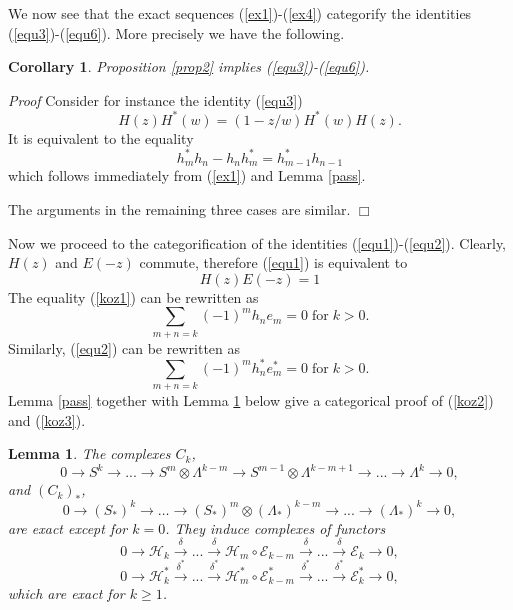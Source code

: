 \documentclass[11pt]{amsart}
\newcounter{theorem}
\newtheorem{lemma}[theo]{Lemma}
\newtheorem{corollary}[theo]{Corollary}
\renewenvironment{proof}{ \emph{Proof}}{$\Box$}
\newcommand{\refle}[1]{Lemma \ref{#1}}
\newcommand{\refprop}[1]{Proposition \ref{#1}}
\newcommand{\refeq}[1]{(\ref{#1})}
\begin{document}
We now see that the exact sequences (\ref{ex1})-(\ref{ex4}) categorify the identities (\ref{equ3})-(\ref{equ6}).
More precisely we have the following.
\begin{corollary}\label{cat1} \refprop{prop2} implies (\ref{equ3})-(\ref{equ6}).
\end{corollary}
\begin{proof} Consider for instance the identity (\ref{equ3})
$$H(z)H^*(w)=(1-z/w)H^*(w)H(z).$$
It is equivalent to the equality
$$h^*_m h_n-h_n h^*_m=h^*_{m-1}h_{n-1}$$
which follows immediately from (\ref{ex1}) and Lemma
\ref{pass}.

The arguments in the remaining three cases are similar. 
\end{proof}

Now we proceed to the categorification of the identities (\ref{equ1})-(\ref{equ2}).
Clearly, $H(z)$ and $E(-z)$ commute, therefore  (\ref{equ1}) is
equivalent to 
\begin{equation}\label{koz1}
H(z)E(-z)=1
\end{equation}
The equality \refeq{koz1} can be rewritten as
\begin{equation}\label{koz2}
\sum_{m+n=k}(-1)^m{h}_n{e}_m=0\;\mathrm{for\;} k>0.
\end{equation}
Similarly, (\ref{equ2}) can be rewritten as 
\begin{equation}\label{koz3}
\sum_{m+n=k}(-1)^m{h}^*_n{e}^*_m=0\;\mathrm{for\;} k>0.
\end{equation}
Lemma \ref{pass} together with \refle{lemma5} below give a categorical
proof of (\ref{koz2}) and (\ref{koz3}).



\begin{lemma}\label{lemma5}
The complexes $C_k$,
$$0\rightarrow S^k\rightarrow ...\rightarrow S^m\otimes\Lambda^{k-m}\rightarrow S^{m-1}\otimes\Lambda^{k-m+1}\rightarrow ...\rightarrow\Lambda^k\rightarrow 0,$$
and $(C_k)_*$,
$$0\rightarrow (S_*)^k\rightarrow \dots\rightarrow (S_*)^m\otimes(\Lambda_*)^{k-m}\rightarrow ...\rightarrow(\Lambda_*)^k\rightarrow 0,$$
are exact except for $k=0$. They induce complexes of functors
\begin{equation}\label{le5eq1}
0\rightarrow \mathcal H_k\xrightarrow{\delta} ...\xrightarrow{\delta} \mathcal H_m\circ
 \mathcal  E_{k-m}\xrightarrow{\delta} ...\xrightarrow{\delta}\mathcal E_k\rightarrow 0,
\end{equation}
\begin{equation}\label{le5eq2}
0\rightarrow \mathcal H^*_k\xrightarrow{\delta^*} ...\xrightarrow{\delta^*} \mathcal H^*_m\circ
 \mathcal E^*_{k-m}\xrightarrow{\delta^*} ...\xrightarrow{\delta^*}\mathcal E^*_k\rightarrow 0,
\end{equation}
which are exact for $k\geq 1$.
\end{lemma}
\end{document}
